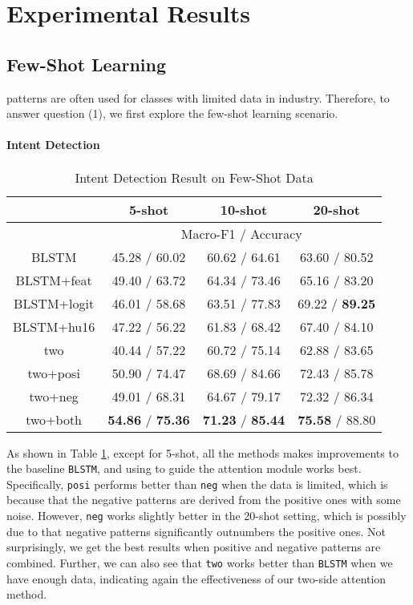 \section{Experimental Results}
\label{sec:experiments}

\subsection{Few-Shot Learning}
\RE patterns are often used for classes with limited data in industry. Therefore, to answer question (1), we first explore the few-shot learning scenario.

\paragraph{Intent Detection}

\begin{table}
\setlength{\tabcolsep}{0.23em}
\centering
\small{
\begin{tabular}{|c|c|c|c|}

\hline
  & \multicolumn{1}{|c|}{5-shot} & \multicolumn{1}{|c|}{10-shot} & \multicolumn{1}{|c|}{20-shot}  \\
 \hline
  & \multicolumn{3}{|c|}{Macro-F1 / Accuracy} \\
\hline
BLSTM & 45.28 / 60.02 & 60.62 / 64.61 & 63.60 / 80.52  \\
\hline
BLSTM+feat & 49.40 / 63.72 & 64.34 / 73.46 & 65.16 / 83.20   \\
\hline
BLSTM+logit & 46.01 / 58.68 & 63.51 / 77.83 & 69.22 / \textbf{89.25} \\
\hline
BLSTM+hu16 & 47.22 / 56.22 & 61.83 / 68.42 & 67.40 / 84.10  \\
\hline
two & 40.44 / 57.22 & 60.72 / 75.14 & 62.88 / 83.65  \\
\hline
two+posi & 50.90 / 74.47 & 68.69 / 84.66 & 72.43 / 85.78  \\
\hline
two+neg & 49.01 / 68.31 & 64.67 / 79.17 & 72.32 / 86.34   \\
\hline
two+both & \textbf{54.86} / \textbf{75.36} & \textbf{71.23} / \textbf{85.44} & \textbf{75.58} / 88.80   \\
\hline

\end{tabular}
}
\caption{Intent Detection Result on Few-Shot Data}
\label{tab_intent_few}
\end{table}

As shown in Table \ref{tab_intent_few}, except for 5-shot, all the methods makes improvements to the baseline \texttt{BLSTM}, and using \RE to guide the attention module works best. Specifically, \texttt{posi} performs better than \texttt{neg} when the data is limited, which is because that the negative patterns are derived from the positive ones with some noise. However, \texttt{neg} works slightly better in the 20-shot setting, which is possibly due to that negative patterns significantly outnumbers the positive ones. Not surprisingly, we get the best results when positive and negative patterns are combined. Further, we can also see that \texttt{two} works better than \texttt{BLSTM} when we have enough data, indicating again the effectiveness of our two-side attention method.

